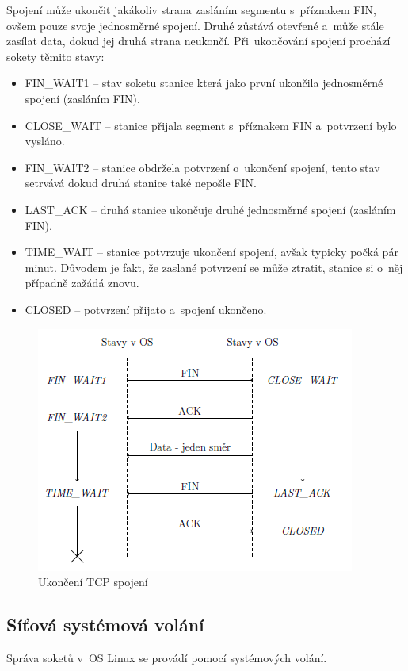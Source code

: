 Spojení může ukončit jakákoliv strana zasláním segmentu s~příznakem FIN, ovšem pouze svoje jednosměrné spojení. Druhé zůstává otevřené a~může stále zasílat data, dokud jej druhá strana neukončí. Při~ukončování spojení prochází sokety těmito stavy:
\begin{itemize}
	\item FIN\_WAIT1 -- stav soketu stanice která jako první ukončila jednosměrné spojení (zasláním FIN).
	\item CLOSE\_WAIT -- stanice přijala segment s~příznakem FIN a~potvrzení bylo vysláno.
	\item FIN\_WAIT2 -- stanice obdržela potvrzení o~ukončení spojení, tento stav setrvává dokud druhá stanice také nepošle FIN.
	\item LAST\_ACK -- druhá stanice ukončuje druhé jednosměrné spojení (zasláním FIN).
	\item TIME\_WAIT -- stanice potvrzuje ukončení spojení, avšak typicky počká pár minut. Důvodem je fakt, že zaslané potvrzení se může ztratit, stanice si o~něj případně zažádá znovu.
	\item CLOSED -- potvrzení přijato a~spojení ukončeno.
\end{itemize}

\begin{figure}
	\centering
	\includegraphics[scale=1]{images/network_tcp_close.png}
	\caption{Ukončení TCP spojení}
	\label{network_tcp_close}
\end{figure}

\subsection{Síťová systémová volání}

Správa soketů v~OS Linux se provádí pomocí systémových volání.


